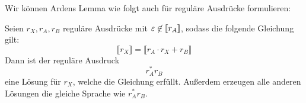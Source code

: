 


 



Wir können Ardens Lemma wie folgt auch für reguläre Ausdrücke formulieren:
\begin{Korollar}
   Seien $r_X,r_A,r_B$ reguläre Ausdrücke mit $\varepsilon \not \in [\![ r_A ]\!]$, sodass die folgende Gleichung gilt:
  \begin{displaymath}
    \llbracket r_X \rrbracket = \llbracket r_A \cdot r_X + r_B \rrbracket
  \end{displaymath}
  Dann ist der reguläre Ausdruck
  \begin{displaymath}
    r_A^*r_B
  \end{displaymath}
  eine Lösung für $r_X$, welche die Gleichung erfüllt. Außerdem erzeugen alle anderen Lösungen die gleiche Sprache wie $r_A^*r_B$.
\end{Korollar}

